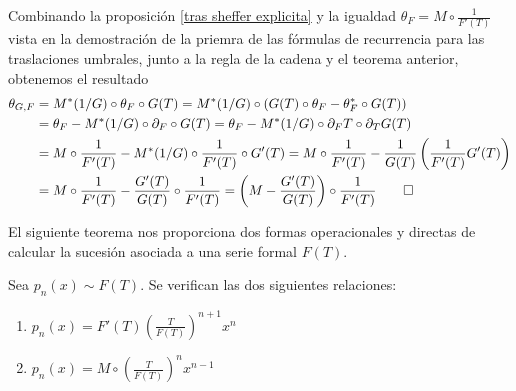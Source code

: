 \begin{demo}
    Combinando la proposición \ref{tras sheffer explicita} y la igualdad $\theta_F = M \circ \frac{1}{F'(T)}$ vista en la demostración de la priemra de las fórmulas de recurrencia para las traslaciones umbrales, junto a la regla de la cadena y el teorema anterior, obtenemos el resultado
    \begin{align*}
        \theta_{G,F} & = M^*(1/G) \circ \theta_F \circ G(T) = M^*(1/G) \circ \left( G(T) \circ \theta_F - \theta_F^* \circ G(T) \right) \\
        & = \theta_F - M^*(1/G) \circ \partial_F \circ G(T) = \theta_F - M^*(1/G) \circ \partial_F T  \circ \partial_T G(T) \\
        & = M \circ \frac{1}{F'(T)} - M^*(1/G) \circ \frac{1}{F'(T)} \circ G'(T) = M \circ \frac{1}{F'(T)} - \frac{1}{G(T)} \left(\frac{1}{F'(T)}G'(T)\right)\\
        & = M \circ \frac{1}{F'(T)} - \frac{G'(T)}{G(T)} \circ \frac{1}{F'(T)} = \left(M - \frac{G'(T)}{G(T)} \right) \circ \frac{1}{F'(T)}\qedhere
    \end{align*}
\end{demo}

El siguiente teorema nos proporciona dos formas operacionales y directas de calcular la sucesión asociada a una serie formal $F(T)$.

\begin{teorema}\label{transferencia asociada}
    Sea $p_n(x) \sim F(T)$. Se verifican las dos siguientes relaciones:
    \begin{enumerate}
        \item $\displaystyle p_n(x) = F'(T)\left(\frac{T}{F(T)}\right)^{n+1} x^n$
        \item $\displaystyle p_n(x) = M \circ \left(\frac{T}{F(T)}\right)^n x^{n-1}$
    \end{enumerate}
\end{teorema}

